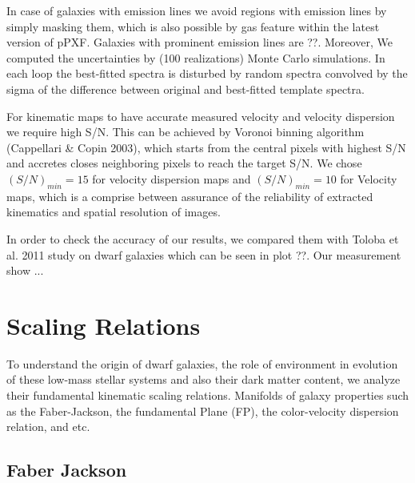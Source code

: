 \documentclass{aa}
\begin{document}
In case of galaxies with emission lines we avoid regions with emission lines by simply masking them, which is also possible by gas feature within the latest version of pPXF. Galaxies with prominent emission lines are ??. Moreover, We computed the uncertainties by (100 realizations) Monte Carlo simulations. In each loop the best-fitted spectra is disturbed by random spectra convolved by the sigma of the difference between original and best-fitted template spectra.  

For kinematic maps to have accurate measured velocity and velocity dispersion we require high S/N. This can be achieved by Voronoi binning algorithm (Cappellari \& Copin 2003), which starts from the central pixels with highest S/N and accretes closes neighboring pixels to reach the target S/N. We chose $(S/N)_{min}=15$ for velocity dispersion maps and $(S/N)_{min}=10$ for Velocity maps, which is a comprise between assurance of the reliability of extracted kinematics and spatial resolution of images.

In order to check the accuracy of our results, we compared them with Toloba et al. 2011 study on dwarf galaxies which can be seen in plot ??. Our measurement show ...

\section{Scaling Relations}
To understand the origin of dwarf galaxies, the role of environment in evolution of these low-mass stellar systems and also their dark matter content, we analyze their fundamental kinematic scaling relations. Manifolds of galaxy properties such as the Faber-Jackson, the fundamental Plane (FP), the color-velocity dispersion relation, and etc. 

\subsection{Faber Jackson}

\end{document}
